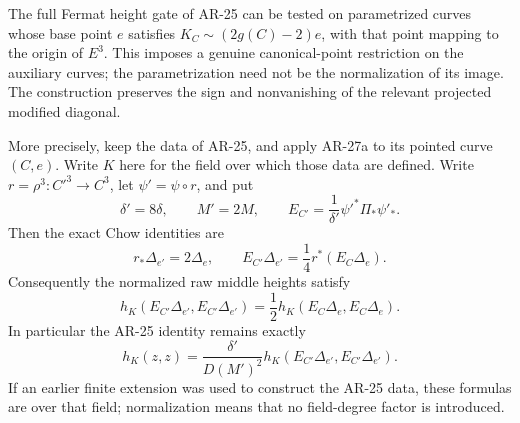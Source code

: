\begin{proposition}[AR-27b]
The full Fermat height gate of AR-25 can be tested on parametrized
curves whose base point $e$ satisfies
$K_C\sim(2g(C)-2)e$, with that point mapping to the origin of
$E^3$.  This imposes a genuine canonical-point restriction on the
auxiliary curves; the parametrization need not be the normalization
of its image.  The construction preserves the sign and nonvanishing of
the relevant projected modified diagonal.

More precisely, keep the data of AR-25, and apply AR-27a to its
pointed curve $(C,e)$.  Write $K$ here for the field over which
those data are defined.  Write $r=\rho^3:C'^3\to C^3$, let
$\psi'=\psi\circ r$, and put
\[
 \delta'=8\delta,\qquad M'=2M,\qquad
 E_{C'}=\frac1{\delta'}\psi'^*\Pi_*\psi'_*.
\]
Then the exact Chow identities are
\[
 r_*\Delta_{e'}=2\Delta_e,
 \qquad
 E_{C'}\Delta_{e'}=\frac14r^*(E_C\Delta_e).             \tag{AR.27b}
\]
Consequently the normalized raw middle heights satisfy
\[
 h_K(E_{C'}\Delta_{e'},E_{C'}\Delta_{e'})
       =\frac12h_K(E_C\Delta_e,E_C\Delta_e).             \tag{AR.27c}
\]
In particular the AR-25 identity remains exactly
\[
 h_K(z,z)=\frac{\delta'}{D(M')^2}
           h_K(E_{C'}\Delta_{e'},E_{C'}\Delta_{e'}).
                                                               \tag{AR.27d}
\]
If an earlier finite extension was used to construct the AR-25
data, these formulas are over that field; normalization means
that no field-degree factor is introduced.
\end{proposition}


